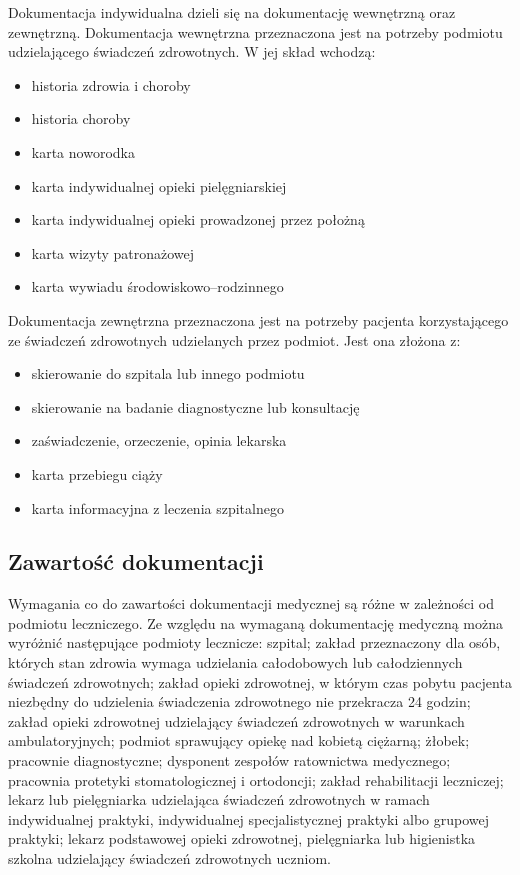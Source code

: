 Dokumentacja indywidualna dzieli się na dokumentację wewnętrzną oraz zewnętrzną. Dokumentacja wewnętrzna przeznaczona jest na potrzeby podmiotu udzielającego świadczeń zdrowotnych. W jej skład wchodzą:
\begin{itemize}
\item historia zdrowia i choroby
\item historia choroby
\item karta noworodka
\item karta indywidualnej opieki pielęgniarskiej
\item karta indywidualnej opieki prowadzonej przez położną
\item karta wizyty patronażowej
\item karta wywiadu środowiskowo–rodzinnego
\end{itemize}
Dokumentacja zewnętrzna przeznaczona jest na potrzeby pacjenta korzystającego ze świadczeń zdrowotnych udzielanych przez podmiot. Jest ona złożona z:
\begin{itemize}
\item skierowanie do szpitala lub innego podmiotu
\item skierowanie na badanie diagnostyczne lub konsultację
\item zaświadczenie, orzeczenie, opinia lekarska
\item karta przebiegu ciąży
\item karta informacyjna z leczenia szpitalnego
\end{itemize}

\subsection{Zawartość dokumentacji}

Wymagania co do zawartości dokumentacji medycznej są różne w zależności od podmiotu leczniczego. Ze względu na wymaganą dokumentację medyczną można wyróżnić następujące podmioty lecznicze: szpital; zakład przeznaczony dla osób, których stan zdrowia wymaga udzielania całodobowych lub całodziennych świadczeń zdrowotnych; zakład opieki zdrowotnej, w którym czas pobytu pacjenta niezbędny do udzielenia świadczenia zdrowotnego nie przekracza 24 godzin; zakład opieki zdrowotnej udzielający świadczeń zdrowotnych w warunkach ambulatoryjnych; podmiot sprawujący opiekę nad kobietą ciężarną; żłobek; pracownie diagnostyczne; dysponent zespołów ratownictwa medycznego; pracownia protetyki stomatologicznej i ortodoncji;  zakład rehabilitacji leczniczej; lekarz lub pielęgniarka udzielająca świadczeń zdrowotnych w ramach indywidualnej praktyki, indywidualnej specjalistycznej praktyki albo grupowej praktyki; lekarz podstawowej opieki zdrowotnej, pielęgniarka lub higienistka szkolna udzielający świadczeń zdrowotnych uczniom.

